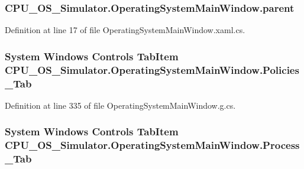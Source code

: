 \subsubsection[{parent}]{ C\+P\+U\+\_\+\+O\+S\+\_\+\+Simulator.\+Operating\+System\+Main\+Window.\+parent\hspace{0.3cm}{\ttfamily [private]}}\label{class_c_p_u___o_s___simulator_1_1_operating_system_main_window_a0219ba1583d00852bea36ac27c9d878d}


Definition at line 17 of file Operating\+System\+Main\+Window.\+xaml.\+cs.

\hypertarget{class_c_p_u___o_s___simulator_1_1_operating_system_main_window_a019542a100cb475965f111d94085a16a}{}
\subsubsection[{Policies\+\_\+\+Tab}]{\setlength{\rightskip}{0pt plus 5cm}System Windows Controls Tab\+Item C\+P\+U\+\_\+\+O\+S\+\_\+\+Simulator.\+Operating\+System\+Main\+Window.\+Policies\+\_\+\+Tab\hspace{0.3cm}{\ttfamily [package]}}\label{class_c_p_u___o_s___simulator_1_1_operating_system_main_window_a019542a100cb475965f111d94085a16a}


Definition at line 335 of file Operating\+System\+Main\+Window.\+g.\+cs.

\hypertarget{class_c_p_u___o_s___simulator_1_1_operating_system_main_window_a01c2d1944c9470e56e5bbbcdff683f2b}{}
\subsubsection[{Process\+\_\+\+Tab}]{\setlength{\rightskip}{0pt plus 5cm}System Windows Controls Tab\+Item C\+P\+U\+\_\+\+O\+S\+\_\+\+Simulator.\+Operating\+System\+Main\+Window.\+Process\+\_\+\+Tab\hspace{0.3cm}{\ttfamily [package]}}\label{class_c_p_u___o_s___simulator_1_1_operating_system_main_window_a01c2d1944c9470e56e5bbbcdff683f2b}


